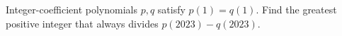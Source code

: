 Integer-coefficient polynomials $p,q$ satisfy $p(1)=q(1)$. Find the greatest positive integer that always divides $p(2023)-q(2023)$.
